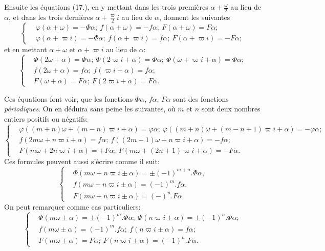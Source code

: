\documentclass{article}
\begin{document}
Ensuite les équations (17.), en y mettant dans les trois premières $\alpha+\frac{\omega}{2}$ au lieu de $\alpha$, et dans les trois dernières $\alpha+\frac{\varpi}{2}i$ au lieu de $\alpha$, donnent les suivantes
\[ \left\{\begin{aligned} &\varphi(\alpha+\omega)=-\Phi\alpha;\ f(\alpha+\omega)=-f\alpha;\ F(\alpha+\omega)=F\alpha;\\ &\varphi(\alpha+\varpi i)=-\Phi\alpha;\ f(\alpha+\varpi i)=f\alpha;\ F(\alpha+\varpi i)=-F\alpha; \end{aligned}\right. \tag{19.} \]
et en mettant $\alpha+\omega$ et $\alpha+\varpi i$ au lieu de $\alpha$:
\[ \left\{\begin{aligned} &\Phi(2\omega+\alpha)=\Phi\alpha;\ \Phi(2\varpi i+\alpha)=\Phi\alpha;\ \Phi(\omega+\varpi i+\alpha)=\Phi\alpha;\\ &f(2\omega+\alpha)=f\alpha;\ f(\varpi i+\alpha)=f\alpha;\\ &F(\omega+\alpha)=F\alpha;\ F(2\varpi i+\alpha)=F\alpha. \end{aligned}\right. \tag{20.} \]

Ces équations font voir, que les fonctions $\Phi\alpha$, $f\alpha$, $F\alpha$ sont des fonctions \emph{périodiques}. On en déduira sans peine les suivantes, où $m$ et $n$ sont deux nombres entiers positifs ou négatifs:
\[ \left\{\begin{aligned} &\varphi((m+n)\omega+(m-n)\varpi i+\alpha)=\varphi\alpha;\ \varphi((m+n)\omega+(m-n+1)\varpi i+\alpha)=-\varphi\alpha;\\ &f(2m\omega+n\varpi i+\alpha)=f\alpha;\ f((2m+1)\omega+n\varpi i+\alpha)=-f\alpha;\\ &F(m\omega+2n\varpi i+\alpha)=+F\alpha;\ F(m\omega+(2n+1)\varpi i+\alpha)=-F\alpha. \end{aligned}\right. \tag{21.} \]
Ces formules peuvent aussi s'écrire comme il suit:
\[ \left\{\begin{aligned} &\Phi(m\omega+n\varpi i\pm\alpha)=\pm(-1)^{m+n}.\Phi\alpha,\\ &f(m\omega+n\varpi i\pm\alpha)=(-1)^{m}.f\alpha,\\ &F(m\omega+n\varpi i\pm\alpha)=(-)^{n}.F\alpha. \end{aligned}\right. \tag{22.} \]
On peut remarquer comme cas particuliers:
\[ \left\{\begin{aligned} &\Phi(m\omega\pm\alpha)=\pm(-1)^{m}.\Phi\alpha;\ \Phi(n\varpi i\pm\alpha)=\pm(-1)^{n}.\Phi\alpha;\\ &f(m\omega\pm\alpha)=(-1)^{m}.f\alpha;\ f(n\varpi i\pm\alpha)=f\alpha;\\ &F(m\omega\pm\alpha)=F\alpha;\ F(n\varpi i\pm\alpha)=(-1)^{n}.F\alpha. \end{aligned}\right. \tag{22$'$.} \]
\end{document}

